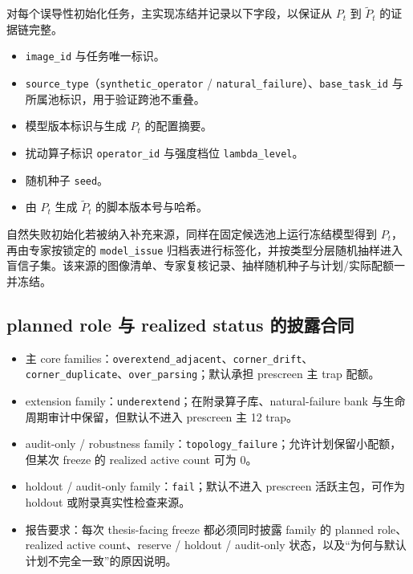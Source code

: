 对每个误导性初始化任务，主实现冻结并记录以下字段，以保证从 $P_t$ 到 $\tilde{P}_t$ 的证据链完整。
\begin{itemize}
    \item \texttt{image\_id} 与任务唯一标识。
    \item \texttt{source\_type}（\texttt{synthetic\_operator} / \texttt{natural\_failure}）、\texttt{base\_task\_id} 与所属池标识，用于验证跨池不重叠。
    \item 模型版本标识与生成 $P_t$ 的配置摘要。
    \item 扰动算子标识 \texttt{operator\_id} 与强度档位 \texttt{lambda\_level}。
    \item 随机种子 \texttt{seed}。
    \item 由 $P_t$ 生成 $\tilde{P}_t$ 的脚本版本号与哈希。
\end{itemize}

自然失败初始化若被纳入补充来源，同样在固定候选池上运行冻结模型得到 $P_t$，再由专家按锁定的 \texttt{model\_issue} 归档表进行标签化，并按类型分层随机抽样进入盲信子集。该来源的图像清单、专家复核记录、抽样随机种子与计划/实际配额一并冻结。

\subsection{planned role 与 realized status 的披露合同}
\begin{itemize}
    \item 主 core families：\texttt{overextend\_adjacent}、\texttt{corner\_drift}、\texttt{corner\_duplicate}、\texttt{over\_parsing}；默认承担 prescreen 主 trap 配额。
    \item extension family：\texttt{underextend}；在附录算子库、natural-failure bank 与生命周期审计中保留，但默认不进入 prescreen 主 12 trap。
    \item audit-only / robustness family：\texttt{topology\_failure}；允许计划保留小配额，但某次 freeze 的 realized active count 可为 0。
    \item holdout / audit-only family：\texttt{fail}；默认不进入 prescreen 活跃主包，可作为 holdout 或附录真实性检查来源。
    \item 报告要求：每次 thesis-facing freeze 都必须同时披露 family 的 planned role、realized active count、reserve / holdout / audit-only 状态，以及“为何与默认计划不完全一致”的原因说明。
\end{itemize}
